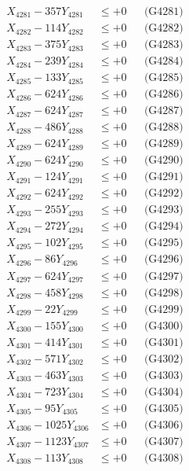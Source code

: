 \documentclass[a4paper,10pt]{article}
\begin{document}
{\begin{align}
\allowbreak
X_{4281} - 357Y_{4281} &\leq +0 && \text{(G4281)} \\
X_{4282} - 114Y_{4282} &\leq +0 && \text{(G4282)} \\
X_{4283} - 375Y_{4283} &\leq +0 && \text{(G4283)} \\
X_{4284} - 239Y_{4284} &\leq +0 && \text{(G4284)} \\
X_{4285} - 133Y_{4285} &\leq +0 && \text{(G4285)} \\
X_{4286} - 624Y_{4286} &\leq +0 && \text{(G4286)} \\
X_{4287} - 624Y_{4287} &\leq +0 && \text{(G4287)} \\
X_{4288} - 486Y_{4288} &\leq +0 && \text{(G4288)} \\
X_{4289} - 624Y_{4289} &\leq +0 && \text{(G4289)} \\
X_{4290} - 624Y_{4290} &\leq +0 && \text{(G4290)} \\
\allowbreak
X_{4291} - 124Y_{4291} &\leq +0 && \text{(G4291)} \\
X_{4292} - 624Y_{4292} &\leq +0 && \text{(G4292)} \\
X_{4293} - 255Y_{4293} &\leq +0 && \text{(G4293)} \\
X_{4294} - 272Y_{4294} &\leq +0 && \text{(G4294)} \\
X_{4295} - 102Y_{4295} &\leq +0 && \text{(G4295)} \\
X_{4296} - 86Y_{4296} &\leq +0 && \text{(G4296)} \\
X_{4297} - 624Y_{4297} &\leq +0 && \text{(G4297)} \\
X_{4298} - 458Y_{4298} &\leq +0 && \text{(G4298)} \\
X_{4299} - 22Y_{4299} &\leq +0 && \text{(G4299)} \\
X_{4300} - 155Y_{4300} &\leq +0 && \text{(G4300)} \\
\allowbreak
X_{4301} - 414Y_{4301} &\leq +0 && \text{(G4301)} \\
X_{4302} - 571Y_{4302} &\leq +0 && \text{(G4302)} \\
X_{4303} - 463Y_{4303} &\leq +0 && \text{(G4303)} \\
X_{4304} - 723Y_{4304} &\leq +0 && \text{(G4304)} \\
X_{4305} - 95Y_{4305} &\leq +0 && \text{(G4305)} \\
X_{4306} - 1025Y_{4306} &\leq +0 && \text{(G4306)} \\
X_{4307} - 1123Y_{4307} &\leq +0 && \text{(G4307)} \\
X_{4308} - 113Y_{4308} &\leq +0 && \text{(G4308)} \\

\end{align}}
\end{document}

